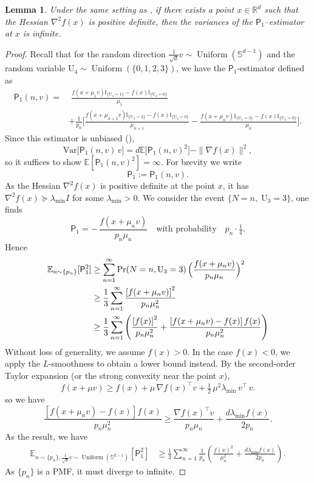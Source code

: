 \documentclass{article}
\newcommand{\Var}{\mathrm{Var}}
\newcommand{\EE}{\mathbb{E}}
\newcommand{\RR}{\mathbb{R}}
\newcommand{\Unif}{\operatorname{Uniform}}
\theoremstyle{definition}
\theoremstyle{plain}
\newtheorem{lemma}[definition]{Lemma}
\theoremstyle{remark}
\newcommand{\sfP}{\mathsf{P}}
\begin{document}
\begin{lemma}\label{lemma:variance-p1}
    Under the same setting as , if there exists a point $x\in \RR^d$ such that the Hessian $\nabla^2 f(x)$ is positive definite, then the variances of the $\sfP_1$--estimator at $x$ is infinite.  
\end{lemma}
\begin{proof}
Recall that for the random direction $\frac{1}{\sqrt{d}}v\sim \Unif(\mathbb{S}^{d-1})$ and the random variable $\mathrm{U}_4 \sim \operatorname{Uniform}\left( \{ 0, 1,2,3 \}\right)$, we have the $\sfP_1$\nobreakdash-estimator defined as
\begin{align*} 
\mathsf{P}_1(n, v)
= 
&\;\frac{f(x+\mu_1 v)\mathbb{I}_{\{\mathrm{U}_4=1\}}-f(x)\mathbb{I}_{\{\mathrm{U}_4=0\}}}{\mu_1}  \\ 
&+\frac{1}{p_n}\Biggl[
    \frac{f(x+\mu_{n+1} v)\mathbb{I}_{\{\mathrm{U}_4=2\}}-f(x)\mathbb{I}_{\{\mathrm{U}_4=0\}}}{\mu_{n+1}}
  - \frac{f(x+\mu_n v)\mathbb{I}_{\{\mathrm{U}_4=3\}}-f(x)\mathbb{I}_{\{\mathrm{U}_4=0\}}}{\mu_n}
\Biggr].
\end{align*} 
Since this estimator is unbiased (),  
\[
\Var\bigl[\mathsf{P}_1(n,v)\,v\bigr]
= d\EE\bigl[\mathsf{P}_1(n,v)^2\bigr] - \|\nabla f(x)\|^2,
\]
so it suffices to show $\EE[\mathsf{P}_1(n,v)^2]=\infty$.  For brevity we write
\[
\sfP_1 := \mathsf{P}_1(n,v).
\]
As the Hessian $\nabla^2 f(x)$ is positive definite at the point $x$, it has $\nabla^2 f(x)\succeq\lambda_{\min}I$ for some $\lambda_{\min}>0$.  
We consider the event $\{N=n,\;\mathrm{U}_3=3\}$, one finds
\[
\sfP_1 = -\,\frac{f(x+\mu_n v)}{p_n \mu_n}
\quad\text{with probability}\quad p_n\cdot\tfrac14.
\]
Hence
\begin{align*}
    \EE_{n\sim \{ p_n\}}[\sfP_1^2] &\geq \sum_{n=1}^\infty
\Pr(N=n,\mathrm{U}_3=3)\,\Bigl(\frac{f(x+\mu_n v)}{p_n \mu_n}\Bigr)^2 \\
&\geq  \frac{1}{3} \sum_{n=1}^\infty \frac{\left[ f(x+\mu_n v)\right]^2}{p_n \mu_n^2}\\
&\geq  \frac{1}{3} \sum_{n=1}^\infty\left(  \frac{\left[  f(x)\right]^2}{p_n \mu_n^2} + \frac{\left[  f(x+\mu_n v) - f(x) \right] f(x) }{p_n \mu_n^2} \right)
\end{align*}
Without loss of generality, we assume $f(x)>0$. In the case $f(x)<0$, we apply the $L$-smoothness to obtain a lower bound instead. By the second‐order Taylor expansion \citep{spivak2008calculus} (or the strong convexity near the point $x$),
$$f(x+\mu v)
\geq f(x) + \mu\,\nabla f(x)^\top v
  + \tfrac12\,\mu^2 \lambda_{\min} \,v^\top \,v .$$
so we have
$$\frac{\left[  f(x+\mu_n v) - f(x) \right] f(x) }{p_n \mu_n^2}  \geq \frac{\nabla f(x)^\top v}{p_n \mu_n} + \frac{d \lambda_{\min } f(x)}{2p_n}.$$
As the result, we have
\begin{align*}
    \EE_{n\sim \{ p_n\},\frac{1}{\sqrt{d}}v\sim \operatorname{Uniform}(\mathbb{S}^{d-1})}[\sfP_1^2] &\geq  \frac{1}{3}\sum_{n=1}^\infty \frac{1}{p_n} \left( \frac{f(x)^2}{\mu_n^2} +  \frac{d \lambda_{\min } f(x)}{2p_n}\right).
\end{align*}
As $\{p_n\}$ is a PMF, it must diverge to infinite.  
\end{proof}
\end{document}
